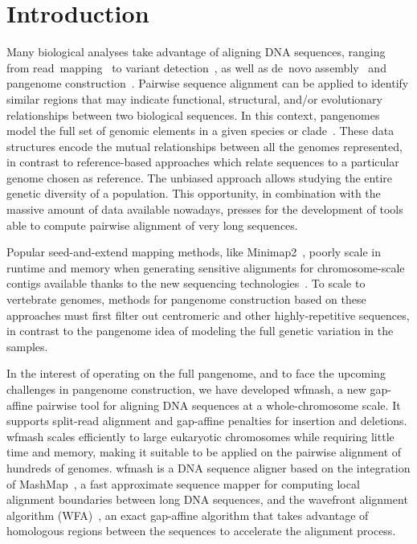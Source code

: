 \documentclass{bioinfo}
\theoremstyle{definition}
\begin{document}
\section{Introduction}
\label{sec:introduction}
Many biological analyses take advantage of aligning DNA sequences, ranging from read~mapping~\citep{Langmead2012, li2013aligning, MarcoSola2012} to variant detection~\citep{DePristo2011}, as well as de~novo assembly~\citep{Simpson2009} and pangenome construction~\citep{Armstrong2020, Li2020, pggb-gh}.
Pairwise sequence alignment can be applied to identify similar regions that may indicate functional, structural, and/or evolutionary relationships between two biological sequences.
In this context, pangenomes model the full set of genomic elements in a given species or clade~\citep{Eizenga_2020}.
These data structures encode the mutual relationships between all the genomes represented, in contrast to reference-based approaches which relate sequences to a particular genome chosen as reference.
The unbiased approach allows studying the entire genetic diversity of a population.
This opportunity, in combination with the massive amount of data available nowadays, presses for the development of tools able to compute pairwise alignment of very long sequences.

Popular seed-and-extend mapping methods, like Minimap2~\citep{Li_2018}, poorly scale in runtime and memory when generating sensitive alignments for chromosome-scale contigs available thanks to the new sequencing technologies~\citep{Garg_2020}.
To scale to vertebrate genomes, methods for pangenome construction based on these approaches must first filter out centromeric and other highly-repetitive sequences, in contrast to the pangenome idea of modeling the full genetic variation in the samples.

In the interest of operating on the full pangenome, and to face the upcoming challenges in pangenome construction, we have developed wfmash, a new gap-affine pairwise tool for aligning DNA sequences at a whole-chromosome scale.
It supports split-read alignment and gap-affine penalties for insertion and deletions.
wfmash scales efficiently to large eukaryotic chromosomes while requiring little time and memory, making it suitable to be applied on the pairwise alignment of hundreds of genomes.
wfmash is a DNA sequence aligner based on the integration of MashMap~\citep{Jain_2018}, a fast approximate sequence mapper for computing local alignment boundaries between long DNA sequences, and the wavefront alignment algorithm (WFA)~\citep{Marco_Sola_2020}, an exact gap-affine algorithm that takes advantage of homologous regions between the sequences to accelerate the alignment process.
\end{document}
